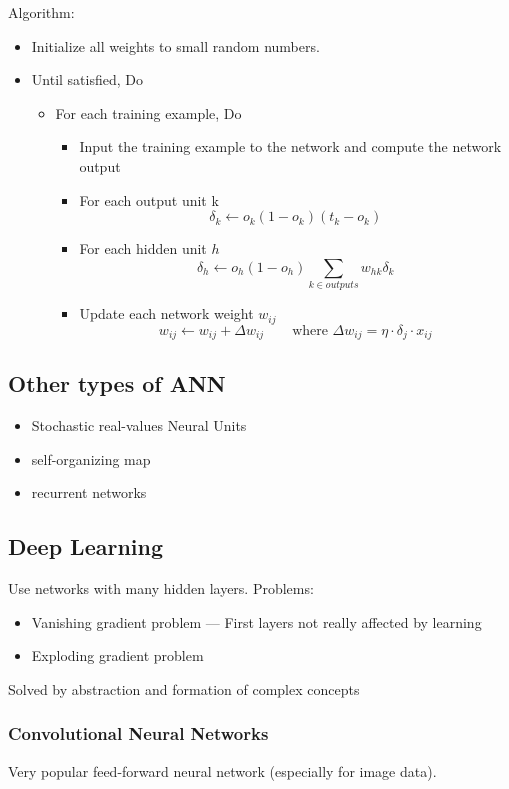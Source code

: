 Algorithm:
\begin{itemize}
\item Initialize all weights to small random numbers.
\item Until satisfied, Do
  \begin{itemize}
  \item For each training example, Do
    \begin{itemize}
    \item Input the training example to the network and compute the network output
    \item For each output unit k
      \[\delta_k \leftarrow o_k (1 - o_k)(t_k - o_k)\]
    \item For each hidden unit \(h\)
      \[\delta_h \leftarrow o_h(1 - o_h) \sum_{k \in \mathit{outputs}} w_{hk}\delta_k\]
    \item Update each network weight \(w_{ij}\)
      \[w_{ij} \leftarrow w_{ij} + \Delta w_{ij} \qquad \text{where } \Delta w_{ij} = \eta \cdot \delta_j \cdot x_{ij}\]
    \end{itemize}
  \end{itemize}
\end{itemize}

\subsection{Other types of ANN}%
\label{nn:sub:other_types_of_ann}
\begin{itemize}
\item Stochastic real-values Neural Units
\item self-organizing map
\item recurrent networks
\end{itemize}

\subsection{Deep Learning}%
\label{nn:sub:deep_learning}
Use networks with many hidden layers. Problems:
\begin{itemize}
\item Vanishing gradient problem --- First layers not really affected by learning
\item Exploding gradient problem
\end{itemize}
Solved by abstraction and formation of complex concepts

\subsubsection{Convolutional Neural Networks}%
\label{nn:ssub:convolutional_neural_networks}
Very popular feed-forward neural network (especially for image data).\\

